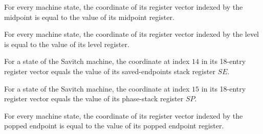 \begin{lemma}
\label{Complexity.LogProg.SavitchARM.St.toV_M}
\leanok
{}
For every machine state, the coordinate of its register vector indexed by the midpoint
is equal to the value of its midpoint register.
\end{lemma}

\begin{lemma}
\label{Complexity.LogProg.SavitchARM.St.toV_I}
\leanok
{}
For every machine state, the coordinate of its register vector indexed by the level is
equal to the value of its level register.
\end{lemma}

\begin{lemma}
\label{Complexity.LogProg.SavitchARM.St.toV_SE}
\leanok
{}
For a state of the Savitch machine, the coordinate at index $14$ in its 18-entry
register vector equals the value of its saved-endpoints stack register $SE$.
\end{lemma}

\begin{lemma}
\label{Complexity.LogProg.SavitchARM.St.toV_SP}
\leanok
{}
For a state of the Savitch machine, the coordinate at index $15$ in its 18-entry
register vector equals the value of its phase-stack register $SP$.
\end{lemma}

\begin{lemma}
\label{Complexity.LogProg.SavitchARM.St.toV_E}
\leanok
{}
For every machine state, the coordinate of its register vector indexed by the popped
endpoint is equal to the value of its popped endpoint register.
\end{lemma}

